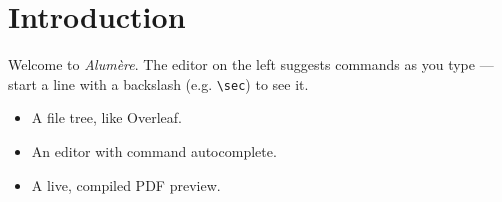 \section{Introduction}
Welcome to \emph{Alumère}. The editor on the left suggests commands as you
type --- start a line with a backslash (e.g. \verb|\sec|) to see it.

\begin{itemize}
  \item A file tree, like Overleaf.
  \item An editor with command autocomplete.
  \item A live, compiled PDF preview.
\end{itemize}

